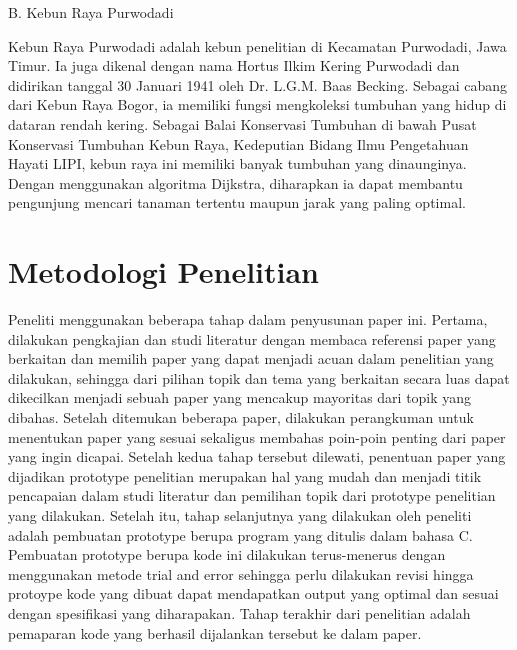 \documentclass[conference]{IEEEtran}
\begin{document}
B. Kebun Raya Purwodadi\vspace{0.5cm}


Kebun Raya Purwodadi adalah kebun penelitian di Kecamatan Purwodadi, Jawa Timur. Ia juga dikenal dengan nama
Hortus Ilkim Kering Purwodadi dan didirikan tanggal 30 Januari 1941 oleh Dr. L.G.M. Baas Becking. Sebagai cabang dari
Kebun Raya Bogor, ia memiliki fungsi mengkoleksi tumbuhan
yang hidup di dataran rendah kering. Sebagai Balai Konservasi
Tumbuhan di bawah Pusat Konservasi Tumbuhan Kebun Raya,
Kedeputian Bidang Ilmu Pengetahuan Hayati LIPI, kebun raya
ini memiliki banyak tumbuhan yang dinaunginya. Dengan
menggunakan algoritma Dijkstra, diharapkan ia dapat membantu pengunjung mencari tanaman tertentu maupun jarak
yang paling optimal.

\section{Metodologi Penelitian}
Peneliti menggunakan beberapa tahap dalam penyusunan
paper ini. Pertama, dilakukan pengkajian dan studi literatur
dengan membaca referensi paper yang berkaitan dan memilih
paper yang dapat menjadi acuan dalam penelitian yang dilakukan, sehingga dari pilihan topik dan tema yang berkaitan
secara luas dapat dikecilkan menjadi sebuah paper yang mencakup mayoritas dari topik yang dibahas. Setelah ditemukan
beberapa paper, dilakukan perangkuman untuk menentukan
paper yang sesuai sekaligus membahas poin-poin penting
dari paper yang ingin dicapai. Setelah kedua tahap tersebut
dilewati, penentuan paper yang dijadikan prototype penelitian
merupakan hal yang mudah dan menjadi titik pencapaian
dalam studi literatur dan pemilihan topik dari prototype penelitian yang dilakukan.
Setelah itu, tahap selanjutnya yang dilakukan oleh peneliti
adalah pembuatan prototype berupa program yang ditulis
dalam bahasa C. Pembuatan prototype berupa kode ini dilakukan terus-menerus dengan menggunakan metode trial and
error sehingga perlu dilakukan revisi hingga protoype kode
yang dibuat dapat mendapatkan output yang optimal dan
sesuai dengan spesifikasi yang diharapakan. Tahap terakhir
dari penelitian adalah pemaparan kode yang berhasil dijalankan tersebut ke dalam paper.
\end{document}
